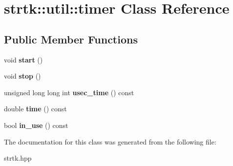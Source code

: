 \hypertarget{classstrtk_1_1util_1_1timer}{\section{strtk\-:\-:util\-:\-:timer Class Reference}
\label{classstrtk_1_1util_1_1timer}
}
\subsection*{Public Member Functions}
\begin{DoxyCompactItemize}
\item 
\hypertarget{classstrtk_1_1util_1_1timer_a31d28a6ff3dbb6c5be74419e87617e1a}{void {\bfseries start} ()}\label{classstrtk_1_1util_1_1timer_a31d28a6ff3dbb6c5be74419e87617e1a}

\item 
\hypertarget{classstrtk_1_1util_1_1timer_aae1f77fbec49de4dc7c40a0c8e984951}{void {\bfseries stop} ()}\label{classstrtk_1_1util_1_1timer_aae1f77fbec49de4dc7c40a0c8e984951}

\item 
\hypertarget{classstrtk_1_1util_1_1timer_a5989fe1184bc0286e4ac58bd4a0a909d}{unsigned long long int {\bfseries usec\-\_\-time} () const }\label{classstrtk_1_1util_1_1timer_a5989fe1184bc0286e4ac58bd4a0a909d}

\item 
\hypertarget{classstrtk_1_1util_1_1timer_ab13cdef53a058234591bc215573ca46f}{double {\bfseries time} () const }\label{classstrtk_1_1util_1_1timer_ab13cdef53a058234591bc215573ca46f}

\item 
\hypertarget{classstrtk_1_1util_1_1timer_adeb364ee296ca55409dfc014488c7991}{bool {\bfseries in\-\_\-use} () const }\label{classstrtk_1_1util_1_1timer_adeb364ee296ca55409dfc014488c7991}

\end{DoxyCompactItemize}


The documentation for this class was generated from the following file\-:\begin{DoxyCompactItemize}
\item 
strtk.\-hpp\end{DoxyCompactItemize}
